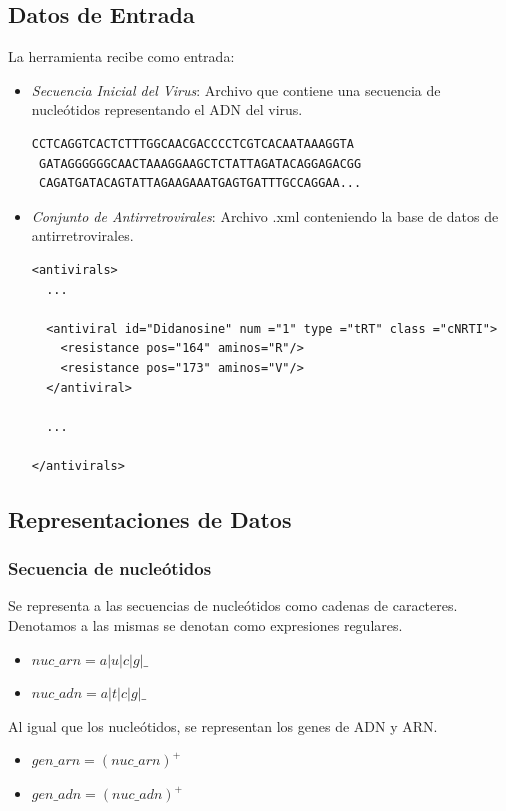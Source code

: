 \subsection{Datos de Entrada}
La herramienta recibe como entrada:
\begin{itemize}
  \item \textit{Secuencia Inicial del Virus}: Archivo que contiene una secuencia de nucle\'otidos representando el ADN del virus.
\begin{lstlisting}[basicstyle=\tt, frame=trBL, tabsize=4,fontadjust=true]
 CCTCAGGTCACTCTTTGGCAACGACCCCTCGTCACAATAAAGGTA
 GATAGGGGGGCAACTAAAGGAAGCTCTATTAGATACAGGAGACGG
 CAGATGATACAGTATTAGAAGAAATGAGTGATTTGCCAGGAA...
\end{lstlisting}
\vspace{.7cm}
 \item \textit{Conjunto de Antirretrovirales}: Archivo .xml conteniendo la base de datos de antirretrovirales.
\begin{lstlisting}[basicstyle=\tt, frame=trBL, tabsize=4,fontadjust=true]
<antivirals>
  ...
  
  <antiviral id="Didanosine" num ="1" type ="tRT" class ="cNRTI">	
    <resistance pos="164" aminos="R"/>
    <resistance pos="173" aminos="V"/>
  </antiviral>

  ...

</antivirals>
\end{lstlisting}

\end{itemize}

\subsection{Representaciones de Datos}
\subsubsection{Secuencia de nucle\'otidos}
Se representa a las secuencias de nucleótidos como cadenas de caracteres. Denotamos a las mismas se denotan como expresiones regulares.
\begin{itemize}
\item $nuc\_arn = a \vert u \vert c \vert g \vert \_$
\item $nuc\_adn = a \vert t \vert c \vert g \vert \_$
\end{itemize} 
Al igual que los nucle\'otidos, se representan los genes de ADN y ARN.
\begin{itemize}
\item $gen\_arn = (nuc\_arn)^{+}$
\item $gen\_adn = (nuc\_adn)^{+}$	
\end{itemize}

